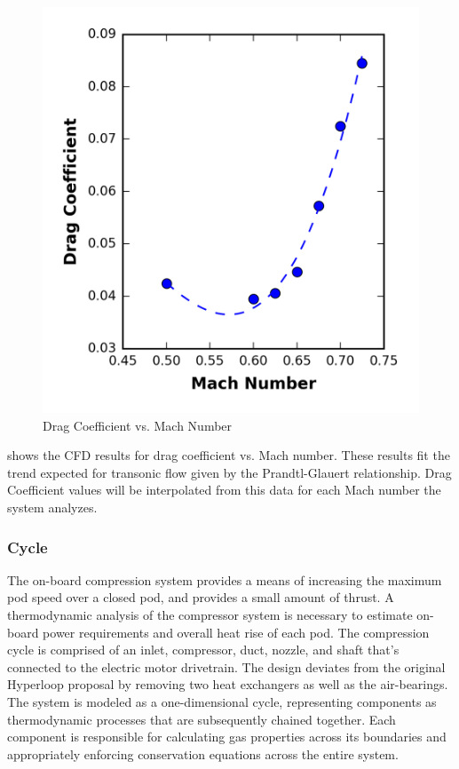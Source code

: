 	\begin{figure}
		\centering
		\includegraphics{../../images/graphs/cd_vs_mach/cd_vs_mach.png}
		\caption{Drag Coefficient vs. Mach Number}
		\label{fig:cd_vs_mach}
	\end{figure}
	 shows the CFD results for drag coefficient vs. Mach number.
	These results fit the trend expected for transonic flow given by the
	Prandtl-Glauert relationship. Drag Coefficient values will be interpolated
	from this data for each Mach number the system analyzes.
\subsubsection{Cycle}
	The on-board compression system provides a means of increasing the maximum
	pod speed over a closed pod,  and provides a small amount of thrust.
	A thermodynamic analysis of the compressor system is necessary to estimate
	on- board power requirements and overall heat rise of each pod.
	The compression cycle is comprised of an inlet, compressor, duct, nozzle,
	and shaft that's connected to the electric motor drivetrain. The design
	deviates from the original Hyperloop proposal by removing two heat
	exchangers as well as the air-bearings. The system is modeled as a
	one-dimensional cycle, representing components as thermodynamic processes
	that are subsequently chained together. Each component is responsible for
	calculating gas properties across its boundaries and appropriately enforcing
	conservation equations across the entire system.
